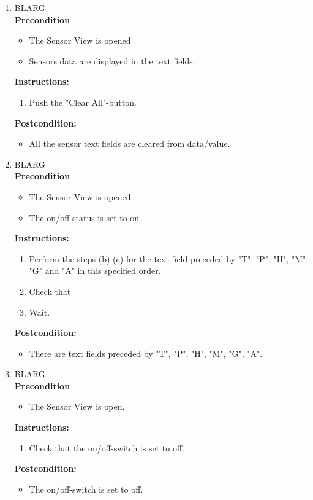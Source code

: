 \documentclass[a4paper]{article}
\newlength{\testlabellength}
\newenvironment{testlist}{\begin{enumerate}[label=\bfseries Instruction \thesubsection.\arabic* , labelindent=0pt, labelwidth=\testlabellength , leftmargin=2cm]}{\end{enumerate}}
\newenvironment{precondition}{
{\color{white}BLARG}\\ 
\textbf{Precondition}
\begin{itemize}[labelindent=0cm, labelwidth=2cm , leftmargin=1cm]
}
{\end{itemize}}
\newenvironment{instruction}{
\textbf{Instructions:}
\begin{enumerate}[label=\bfseries  \arabic*., labelindent=0cm, labelwidth=2cm , leftmargin=1cm]
}
{\end{enumerate}}
\newenvironment{postcondition}{
\textbf{Postcondition:}
\begin{itemize}[labelindent=0cm, labelwidth=2cm , leftmargin=1cm]
}
{\end{itemize}}
\begin{document}
\begin{appendices}
\begin{testlist}
	\item
		\begin{precondition}
			\item The Sensor View is opened
			\item Sensors data are displayed in the text fields.
		\end{precondition}
		\begin{instruction}
			\item Push the "Clear All"-button.
		\end{instruction}
		\begin{postcondition}
			\item All the sensor text fields are cleared from data/value.
		\end{postcondition}

	\item
		\begin{precondition}
			\item The Sensor View is opened
			\item The on/off-status is set to on
		\end{precondition}
		\begin{instruction}
			\item Perform the steps (b)-(c) for the text field preceded by "T", "P", "H", "M", "G" and "A" in this specified order.
    		\item Check that 
	    	\item Wait.
    	\end{instruction}
    	\begin{postcondition}
    		\item There are text fields preceded by "T", "P", "H", "M", "G", "A".
    	\end{postcondition}


	\item
		\begin{precondition}
			\item The Sensor View is open.
		\end{precondition}
		\begin{instruction}
			\item Check that the on/off-switch is set to off.
		\end{instruction}
		\begin{postcondition}
			\item The on/off-switch is set to off.
		\end{postcondition}


\end{testlist}
\end{appendices}
\end{document}
